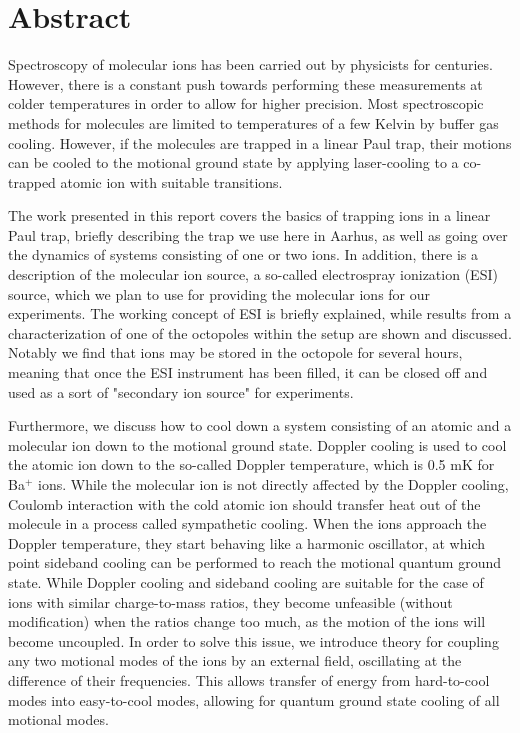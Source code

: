 
\setcounter{page}{2}

\vspace*{0.5cm}
\section*{Abstract}
\thispagestyle{empty}

Spectroscopy of molecular ions has been carried out by physicists for centuries. However, there is a constant push towards performing these measurements at colder temperatures in order to allow for higher precision.
Most spectroscopic methods for molecules are limited to temperatures of a few Kelvin by buffer gas cooling.  However, if the molecules are trapped in a linear Paul trap, their motions can be cooled to the motional ground state by applying laser-cooling to a co-trapped atomic ion with suitable transitions.

The work presented in this report covers the basics of trapping ions in a linear Paul trap, briefly describing the trap we use here in Aarhus, as well as going over the dynamics of systems consisting of one or two ions.
In addition, there is a description of the molecular ion source, a so-called electrospray ionization (ESI) source, which we plan to use for providing the molecular ions for our experiments.
The working concept of ESI is briefly explained, while results from a characterization of one of the octopoles within the setup are shown and discussed. Notably we find that ions may be stored in the octopole for several hours, meaning that once the ESI instrument has been filled, it can be closed off and used as a sort of "secondary ion source" for experiments.

Furthermore, we discuss how to cool down a system consisting of an atomic and a molecular ion down to the motional ground state. Doppler cooling is used to cool the atomic ion down to the so-called Doppler temperature, which is 0.5 mK for Ba$^+$ ions. While the molecular ion is not directly affected by the Doppler cooling, Coulomb interaction with the cold atomic ion should transfer heat out of the molecule in a process called sympathetic cooling. When the ions approach the Doppler temperature, they start behaving like a harmonic oscillator, at which point sideband cooling can be performed to reach the motional quantum ground state.
While Doppler cooling and sideband cooling are suitable for the case of ions with similar charge-to-mass ratios, they become unfeasible (without modification) when the ratios change too much, as the motion of the ions will become uncoupled.
In order to solve this issue, we introduce theory for coupling any two motional modes of the ions by an external field, oscillating at the difference of their frequencies. This allows transfer of energy from hard-to-cool modes into easy-to-cool modes, allowing for quantum ground state cooling of all motional modes.

